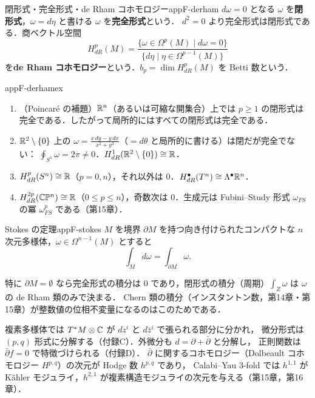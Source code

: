 \begin{mydef}{閉形式・完全形式・de Rham コホモロジー}{appF-derham}
$d\omega=0$ となる $\omega$ を\textbf{閉形式}，$\omega=d\eta$ と書ける $\omega$ を\textbf{完全形式}という．
$d^2=0$ より完全形式は閉形式である．商ベクトル空間
\[
H^p_{dR}(M)=\frac{\{\omega\in\Omega^p(M)\mid d\omega=0\}}{\{d\eta\mid\eta\in\Omega^{p-1}(M)\}}
\]
を\textbf{de Rham コホモロジー}という．$b_p=\dim H^p_{dR}(M)$ を Betti 数という．
\end{mydef}

\begin{myex}{}{appF-derhamex}
\begin{enumerate}
\item （Poincaré の補題）$\mathbb{R}^n$（あるいは可縮な開集合）上では $p\geq1$ の閉形式は完全である．したがって局所的にはすべての閉形式は完全である．
\item $\mathbb{R}^2\setminus\{0\}$ 上の $\omega=\frac{x\,dy-y\,dx}{x^2+y^2}$（$=d\theta$ と局所的に書ける）は閉だが完全でない：
$\oint_{S^1}\omega=2\pi\ne0$．$H^1_{dR}(\mathbb{R}^2\setminus\{0\})\cong\mathbb{R}$．
\item $H^p_{dR}(S^n)\cong\mathbb{R}$（$p=0,n$），それ以外は $0$．$H^\bullet_{dR}(T^n)\cong\Lambda^\bullet\mathbb{R}^n$．
\item $H^{2p}_{dR}(\mathbb{C}\mathbb{P}^n)\cong\mathbb{R}$（$0\leq p\leq n$），奇数次は $0$．生成元は Fubini--Study 形式 $\omega_{FS}$ の冪 $\omega_{FS}^p$ である（第15章）．
\end{enumerate}
\end{myex}

\begin{mythm}{Stokes の定理}{appF-stokes}
$M$ を境界 $\partial M$ を持つ向き付けられたコンパクトな $n$ 次元多様体，$\omega\in\Omega^{n-1}(M)$ とすると
\[
\int_Md\omega=\int_{\partial M}\omega .
\]
\end{mythm}

特に $\partial M=\emptyset$ なら完全形式の積分は $0$ であり，閉形式の積分（周期）$\int_Z\omega$ は $\omega$ の de Rham 類のみで決まる．
Chern 類の積分（インスタントン数，第14章・第15章）が整数値の位相不変量になるのはこのためである．

\begin{note}
複素多様体では $T^*M\otimes\mathbb{C}$ が $dz^i$ と $d\bar z^i$ で張られる部分に分かれ，
微分形式は $(p,q)$ 形式に分解する（付録C）．外微分も $d=\partial+\bar\partial$ と分解し，
正則関数は $\bar\partial f=0$ で特徴づけられる（付録D）．
$\bar\partial$ に関するコホモロジー（Dolbeault コホモロジー $H^{p,q}$）の次元が Hodge 数 $h^{p,q}$ であり，
Calabi--Yau 3-fold では $h^{1,1}$ が Kähler モジュライ，$h^{2,1}$ が複素構造モジュライの次元を与える（第15章，第16章）．
\end{note}

